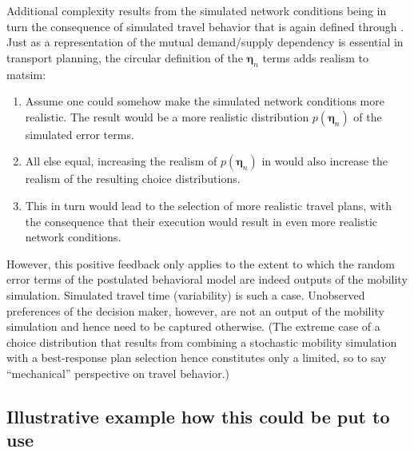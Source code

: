Additional complexity results from the simulated network conditions
being in turn the consequence of simulated travel behavior that is
again defined through . 
Just as a representation
of the mutual demand/supply dependency is essential in transport planning,
the circular definition of the $\boldsymbol{\eta}_n$ terms adds realism to \gls{matsim}:
\begin{enumerate}
\item Assume one could somehow make the simulated network conditions more
realistic. The result would be a more realistic distribution $p(\boldsymbol{\eta}_n)$
of the simulated error terms.
\item All else equal, increasing the realism of $p(\boldsymbol{\eta}_n)$ in 
would also increase the realism of the resulting choice distributions.
\item This in turn would lead to the selection of more realistic travel
plans, with the consequence that their execution would result in even
more realistic network conditions.
\end{enumerate}
However, this positive feedback only applies to the extent to which
the random error terms of the postulated behavioral model are indeed
outputs of the mobility simulation. Simulated travel time (variability)
is such a case. Unobserved preferences of the decision maker, however,
are not an output of the mobility simulation and hence need to be
captured otherwise. (The extreme case of a choice distribution that
results from combining a stochastic mobility simulation with a best-response
plan selection hence constitutes only a limited, so to say {}``mechanical''
perspective on travel behavior.)

\subsection{Illustrative example how this could be put to use}

